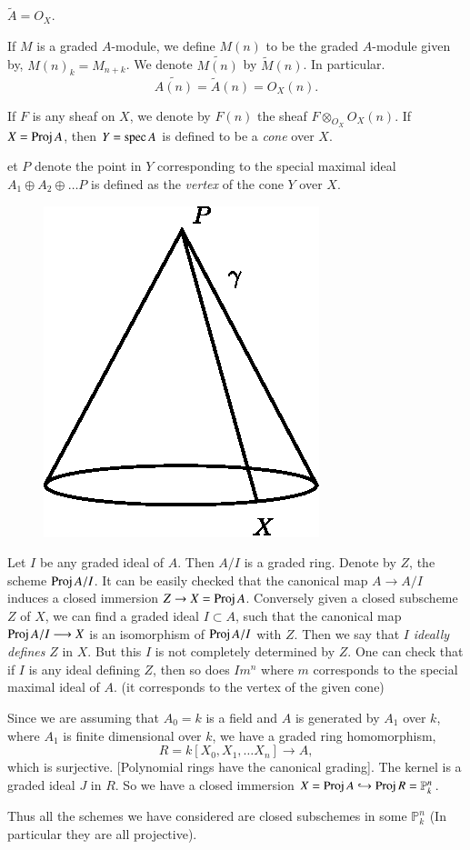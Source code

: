 \begin{REM*}
$\tilde{A}=O_X$.

If $M$ is a graded $A$-module, we define $M(n)$ to be the graded
$A$-module given by, $M(n)_k=M_{n+k}$. We denote $\widetilde{M(n)}$ by
$\tilde{M}(n)$. In particular.
$$
\widetilde{A(n)}=\tilde{A}(n)=O_X(n).
$$

If $F$ is any sheaf on $X$, we denote by $F(n)$ the sheaf
$F\otimes_{O_X}O_X(n)$. If $X=\operatorname{Proj} A$, then $Y=\operatorname{spec} A$ is defined to
be a {\it cone} over $X$.


et $P$ denote the point in $Y$ corresponding to the special maximal
ideal $A_1\oplus A_2\oplus\ldots P$ is defined as the {\it vertex} of
the cone $Y$ over $X$.
\begin{figure}[H]
\centering
\includegraphics{figure/addfig1.eps}
\end{figure}


Let $I$ be any graded ideal of $A$. Then $A/I$ is a graded
ring. Denote by $Z$, the scheme $\operatorname{Proj} A/I$. It can be easily checked
that the canonical map $A\longrightarrow A/I$ induces a closed
immersion $Z\rightarrow X=\operatorname{Proj} A$. Conversely given a closed
subscheme $Z$ of $X$, we can find a graded ideal $I\subset A$, such
that the canonical map $\operatorname{Proj} A/I\longrightarrow X$ is an isomorphism
of $\operatorname{Proj} A/I$ with $Z$. Then we say that $I$ {\it ideally defines}
$Z$ in $X$. But this $I$ is not completely determined by $Z$. One can
check that if $I$ is any ideal defining $Z$, then so does $Im^n$
where $m$ corresponds to the special maximal ideal of $A$. (\ie it
corresponds to the vertex of the given cone)

Since we are assuming that $A_0=k$ is a field and $A$ is generated by
$A_1$ over $k$, where $A_1$ is finite dimensional over $k$, we have a
graded ring homomorphism,\pageoriginale
$$
R=k[X_0, X_1,\ldots X_n]\longrightarrow A,
$$
which is surjective. [Polynomial rings have the canonical
  grading]. The kernel is a graded ideal $J$ in $R$. So we have a
closed immersion $X=\operatorname{Proj} A\hookrightarrow\operatorname{Proj} R=\mathbb{P}_k^n$.

Thus all the schemes we have considered are closed subschemes in some
$\mathbb{P}_k^n$ (In particular they are all projective).
\end{REM*}

